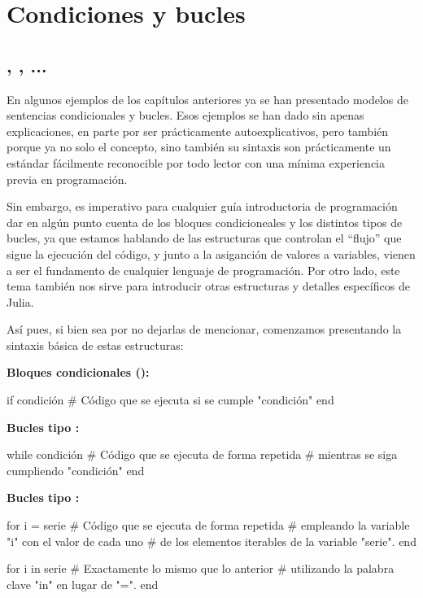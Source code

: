 \chapter{Condiciones y bucles}

\section{, , ...}

En algunos ejemplos de los capítulos anteriores ya se han presentado modelos de sentencias condicionales y bucles. Esos ejemplos se han dado sin apenas explicaciones, en parte por ser prácticamente autoexplicativos, pero también porque ya no solo el concepto, sino también su sintaxis son prácticamente un estándar fácilmente reconocible por todo lector con una mínima experiencia previa en programación.

Sin embargo, es imperativo para cualquier guía introductoria de programación dar en algún punto cuenta de los bloques condicioneales y los distintos tipos de bucles, ya que estamos hablando de las estructuras que controlan el ``flujo'' que sigue la ejecución del código, y junto a la asiganción de valores a variables, vienen a ser el fundamento de cualquier lenguaje de programación. Por otro lado, este tema también nos sirve para introducir otras estructuras y detalles específicos de Julia.

Así pues, si bien sea por no dejarlas de mencionar, comenzamos presentando la sintaxis básica de estas estructuras:

\textbf{Bloques condicionales ():}

\begin{juliacode}
if condición
  # Código que se ejecuta si se cumple "condición"
end
\end{juliacode}

\textbf{Bucles tipo :}

\begin{juliacode}
while condición
  # Código que se ejecuta de forma repetida
  # mientras se siga cumpliendo "condición"
end
\end{juliacode}

\textbf{Bucles tipo :}

\begin{juliacode}
for i = serie
  # Código que se ejecuta de forma repetida
  # empleando la variable "i" con el valor de cada uno
  # de los elementos iterables de la variable "serie".
end

for i in serie
  # Exactamente lo mismo que lo anterior
  # utilizando la palabra clave "in" en lugar de "=".
end
\end{juliacode}

